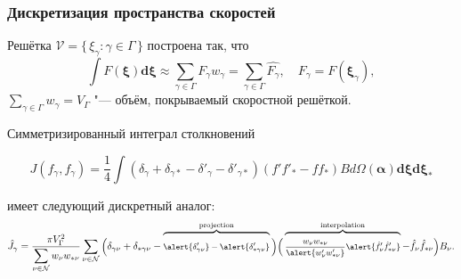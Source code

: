 \documentclass[mathserif]{beamer} %
\newcommand{\dd}{d}%
\newcommand{\dxi}{\boldsymbol{\dd\xi}}
\newcommand{\bxi}{\boldsymbol{\xi}}
\newcommand{\Nu}{\mathcal{N}}
\newcommand{\Set}[2]{\{\,{#1}:{#2}\,\}}
\newcommand{\xoverbrace}[2][\vphantom{\int}]{\overbrace{#1#2}}
\begin{document}
\begin{frame}
    \frametitle{Дискретизация пространства скоростей}
    Решётка \(\mathcal{V} = \Set{\xi_\gamma}{\gamma\in\Gamma}\) построена так, что
    \begin{equation}\label{eq:xi_cubature}
        \int F(\bxi) \dxi \approx \sum_{\gamma\in\Gamma} F_\gamma w_\gamma =
            \sum_{\gamma\in\Gamma} \hat{F_\gamma},
            \quad F_\gamma = F(\bxi_\gamma),
    \end{equation}
    \(\sum_{\gamma\in\Gamma} w_\gamma = V_\Gamma\) "--- объём, покрываемый скоростной решёткой.
    \pause\vspace{10pt}

    Симметризированный интеграл столкновений\vspace{-20pt}

    \begin{equation}\label{eq:symm_ci}
        J(f_\gamma, f_\gamma) = \frac14\int \left(
            \delta_\gamma + \delta_{\gamma*} - \delta'_\gamma - \delta'_{\gamma*}
        \right) (f'f'_* - ff_*)B \dd\Omega(\boldsymbol{\alpha}) \dxi\dxi_*
    \end{equation}\vspace{-30pt}

    имеет следующий дискретный аналог:
    \begin{equation}\label{eq:discrete_symm_ci}
        \footnotesize
        \hat{J}_\gamma = \frac{\pi V_\Gamma^2}{\displaystyle\sum_{\nu\in\Nu} w_{\nu}w_{*\nu}}
            \sum_{\nu\in\Nu} \bigg(
                \delta_{\gamma\nu} + \delta_{*\gamma\nu} -
                \xoverbrace{ \alert{\delta'_{\gamma\nu}} - \alert{\delta'_{*\gamma\nu}} }^\text{projection}
            \bigg)\bigg(
                \xoverbrace{ \frac{w_{\nu}w_{*\nu}}{\alert{w'_{\nu}w'_{*\nu}}}
                \alert{\hat{f}'_{\nu}\hat{f}'_{*\nu}} }^\text{interpolation} - \hat{f}_{\nu}\hat{f}_{*\nu}
            \bigg)B_\nu.
    \end{equation}\vspace{-10pt}
\end{frame}
\end{document}
